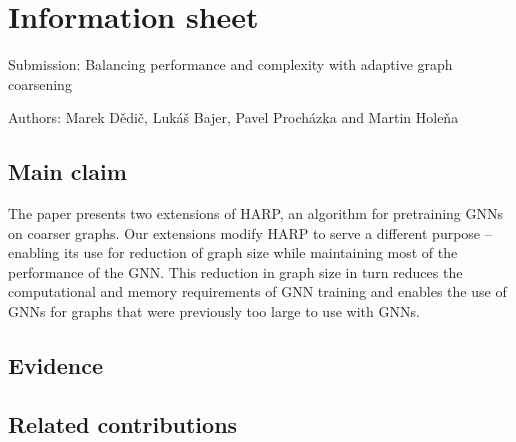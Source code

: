 \documentclass[sn-mathphys,pdflatex]{sn-jnl}%
\begin{document}
\section*{Information sheet}

Submission: Balancing performance and complexity with adaptive graph coarsening

\noindent Authors: Marek Dědič, Lukáš Bajer, Pavel Procházka and Martin Holeňa

\subsection*{Main claim}

The paper presents two extensions of HARP, an algorithm for pretraining GNNs on coarser graphs. Our extensions modify HARP to serve a different purpose -- enabling its use for reduction of graph size while maintaining most of the performance of the GNN. This reduction in graph size in turn reduces the computational and memory requirements of GNN training and enables the use of GNNs for graphs that were previously too large to use with GNNs.

\subsection*{Evidence}

\subsection*{Related contributions}
\end{document}
